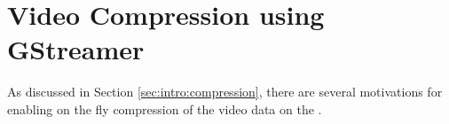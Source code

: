 \chapter{Video Compression using GStreamer}
\label{chap:gstreamer}

As discussed in Section \ref{sec:intro:compression}, there are several motivations for enabling on the fly compression of the video data on the \sr.



